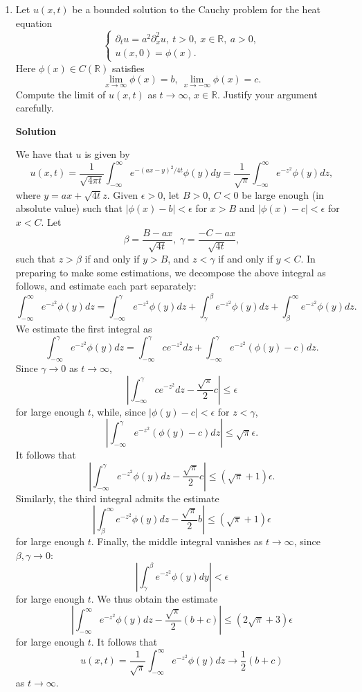 \documentclass{article}
\begin{document}
\begin{enumerate}
\item Let \(u(x,t)\) be a bounded solution to the Cauchy problem for the heat equation
\[\left\{ \begin{array}{l} \partial_t u = a^2 \partial_x^2 u, \ t > 0, \ x \in \mathbb{R}, \ a > 0, \\
                           u(x,0) = \phi(x). \end{array} \right.\]
Here \(\phi(x) \in C(\mathbb{R})\) satisfies
\[\lim_{x \to \infty} \phi(x) = b, \ \lim_{x \to -\infty} \phi(x) = c.\]
Compute the limit of \(u(x,t)\) as \(t \to \infty\), \(x \in \mathbb{R}\).  Justify your argument carefully.

{\bf Solution}

We have that \(u\) is given by
\[u(x,t) = \frac{1}{\sqrt{4 \pi t}} \int_{-\infty}^{\infty} e^{-(a x - y)^2 / 4 t} \phi(y) dy
         = \frac{1}{\sqrt{\pi}} \int_{-\infty}^{\infty} e^{-z^2} \phi(y) dz,\]
where \(y = a x + \sqrt{4 t} z\).  Given \(\epsilon > 0\), let \(B > 0\), \(C < 0\) be large enough (in absolute value) such that \(|\phi(x) - b| < \epsilon\) for \(x > B\) and \(|\phi(x) - c| < \epsilon\) for \(x < C\).  Let
\[\beta = \frac{B - a x}{\sqrt{4 t}}, \ \gamma = \frac{-C - a x}{\sqrt{4 t}},\]
such that \(z > \beta\) if and only if \(y > B\), and \(z < \gamma\) if and only if \(y < C\).  In preparing to make some estimations, we decompose the above integral as follows, and estimate each part separately:
\[\int_{-\infty}^{\infty} e^{-z^2} \phi(y) dz
  = \int_{-\infty}^{\gamma} e^{-z^2} \phi(y) dz + \int_{\gamma}^{\beta} e^{-z^2} \phi(y) dz + \int_{\beta}^{\infty} e^{-z^2} \phi(y) dz.\]
We estimate the first integral as
\[\int_{-\infty}^{\gamma} e^{-z^2} \phi(y) dz
  = \int_{-\infty}^{\gamma} c e^{-z^2} dz + \int_{-\infty}^{\gamma} e^{-z^2} (\phi(y) - c) dz.\]
Since \(\gamma \to 0\) as \(t \to \infty\),
\[\left| \int_{-\infty}^{\gamma} c e^{-z^2} dz - \frac{\sqrt{\pi}}{2} c \right| \leq \epsilon\]
for large enough \(t\), while, since \(|\phi(y) - c| < \epsilon\) for \(z < \gamma\),
\[\left| \int_{-\infty}^{\gamma} e^{-z^2} (\phi(y) - c) dz \right| \leq \sqrt{\pi} \epsilon.\]
It follows that
\[\left| \int_{-\infty}^{\gamma} e^{-z^2} \phi(y) dz - \frac{\sqrt{\pi}}{2} c \right| \leq \left( \sqrt{\pi} + 1 \right) \epsilon.\]
Similarly, the third integral admits the estimate
\[\left| \int_{\beta}^{\infty} e^{-z^2} \phi(y) dz - \frac{\sqrt{\pi}}{2} b \right| \leq \left( \sqrt{\pi} + 1 \right) \epsilon\]
for large enough \(t\).  Finally, the middle integral vanishes as \(t \to \infty\), since \(\beta, \gamma \to 0\):
\[\left| \int_{\gamma}^{\beta} e^{-z^2} \phi(y) dy \right| < \epsilon\]
for large enough \(t\).  We thus obtain the estimate
\[\left| \int_{-\infty}^{\infty} e^{-z^2} \phi(y) dz - \frac{\sqrt{\pi}}{2} (b + c) \right| \leq \left( 2 \sqrt{\pi} + 3 \right) \epsilon\]
for large enough \(t\).  It follows that
\[u(x,t) = \frac{1}{\sqrt{\pi}} \int_{-\infty}^{\infty} e^{-z^2} \phi(y) dz \to \frac{1}{2} (b + c)\]
as \(t \to \infty\).




\end{enumerate}
\end{document}
